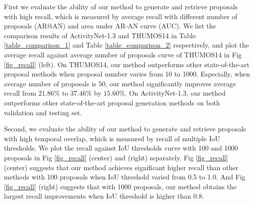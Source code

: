 \documentclass[runningheads]{llncs}
\begin{document}
First we evaluate the ability of our method to generate and retrieve proposals with high recall, which is measured by average recall with different number  of proposals (AR@AN) and area under AR-AN curve (AUC). We list the comparison results of ActivityNet-1.3 and THUMOS14 in Table \ref{table_comparison_1} and Table \ref{table_comparison_2} respectively, and plot the average recall against average number of proposals curve of THUMOS14 in Fig \ref{fig_recall} (left).
On THUMOS14, our method outperforms other state-of-the-art proposal methods when proposal number varies from 10 to 1000. Especially, when average number of proposals is 50, our method significantly improves average recall from $21.86\%$ to $37.46\%$ by $15.60\%$. On ActivityNet-1.3, our method outperforms other state-of-the-art proposal generation methods on both validation and testing set. %


Second, we evaluate the ability of our method to generate and retrieve proposals with high temporal overlap, which is measured by recall of multiple IoU thresholds.
We plot the recall against IoU thresholds curve with 100 and 1000 proposals in Fig \ref{fig_recall} (center) and (right) separately.
Fig \ref{fig_recall} (center) suggests that our method achieves significant higher recall than other methods with 100 proposals when IoU threshold varied from 0.5 to 1.0.
 And Fig \ref{fig_recall} (right) suggests that with 1000 proposals, our method obtains the largest recall improvements when IoU threshold is higher than 0.8.
\end{document}
